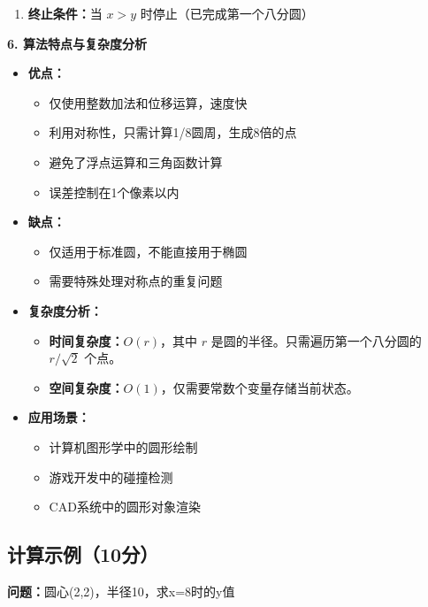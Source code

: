 ﻿\documentclass[12pt,a4paper]{article}
\begin{document}
\begin{tcolorbox}[breakable]
\begin{enumerate}
\item \textbf{终止条件：}当 $x > y$ 时停止（已完成第一个八分圆）
\end{enumerate}

\vspace{3mm}

\textbf{6. 算法特点与复杂度分析}

\begin{itemize}
\item \textbf{优点：}
  \begin{itemize}
  \item 仅使用整数加法和位移运算，速度快
  \item 利用对称性，只需计算1/8圆周，生成8倍的点
  \item 避免了浮点运算和三角函数计算
  \item 误差控制在1个像素以内
  \end{itemize}
  
\item \textbf{缺点：}
  \begin{itemize}
  \item 仅适用于标准圆，不能直接用于椭圆
  \item 需要特殊处理对称点的重复问题
  \end{itemize}

\item \textbf{复杂度分析：}
  \begin{itemize}
  \item \textbf{时间复杂度：}$O(r)$，其中 $r$ 是圆的半径。只需遍历第一个八分圆的 $r/\sqrt{2}$ 个点。
  \item \textbf{空间复杂度：}$O(1)$，仅需要常数个变量存储当前状态。
  \end{itemize}

\item \textbf{应用场景：}
  \begin{itemize}
  \item 计算机图形学中的圆形绘制
  \item 游戏开发中的碰撞检测
  \item CAD系统中的圆形对象渲染
  \end{itemize}
\end{itemize}
\end{tcolorbox}

\subsection{计算示例（10分）}

\textbf{问题：}圆心(2,2)，半径10，求x=8时的y值
\end{document}
